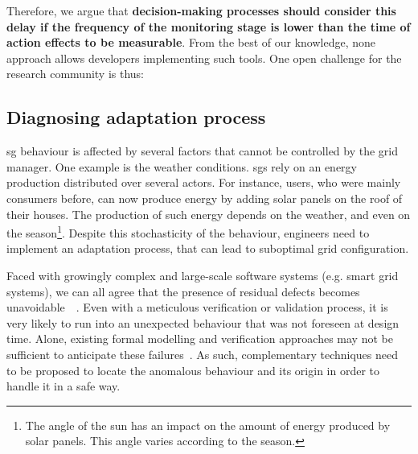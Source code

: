 Therefore, we argue that \textbf{decision-making processes should consider this delay if the frequency of the monitoring stage is lower than the time of action effects to be measurable}.
From the best of our knowledge, none approach allows developers implementing such tools.
One open challenge for the research community is thus:
\vspace{-2em}


\subsection{Diagnosing adaptation process}
\Gls{sg} \gls{behaviour} is affected by several factors that cannot be controlled by the grid manager.
One example is the weather conditions.
\Glspl{sg} rely on an energy production distributed over several actors.
For instance, users, who were mainly consumers before, can now produce energy by adding solar panels on the roof of their houses.
The production of such energy depends on the weather, and even on the season\footnote{The angle of the sun has an impact on the amount of energy produced by solar panels. This angle varies according to the season.}.
Despite this stochasticity of the \gls{behaviour}, engineers need to implement an adaptation process, that can lead to suboptimal grid configuration.

Faced with growingly complex and large-scale software systems (e.g. smart grid systems), we can all agree that the presence of residual defects becomes unavoidable~~\cite{DBLP:conf/icse/BarbosaLMJ17, DBLP:conf/icse/MongielloPS15, DBLP:conf/icse/HassanBB15}. 
Even with a meticulous verification or validation process, it is very likely to run into an unexpected behaviour that was not foreseen at design time. 
Alone, existing formal modelling and verification approaches may not be sufficient to anticipate these failures~\cite{DBLP:conf/icse/TaharaOH17}. 
As such, complementary techniques need to be proposed to locate the anomalous behaviour and its origin in order to handle it in a safe way.

